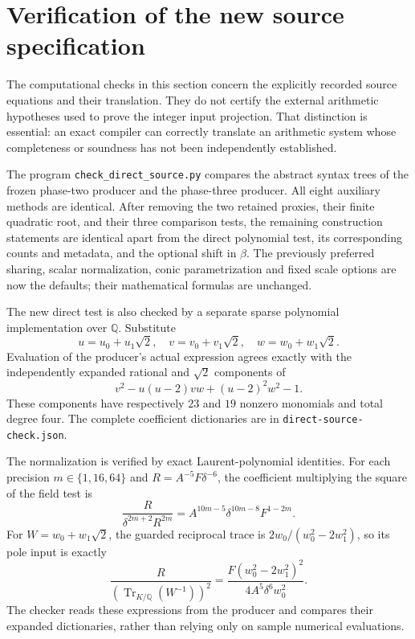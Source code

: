 \section{Verification of the new source specification}
\label{sec:direct-source-review}

The computational checks in this section concern the explicitly
recorded source equations and their translation.  They do not certify
the external arithmetic hypotheses used to prove the integer input
projection.  That distinction is essential: an exact compiler can
correctly translate an arithmetic system whose completeness or soundness
has not been independently established.

The program \texttt{check\_direct\_source.py} compares the abstract
syntax trees of the frozen phase-two producer and the phase-three
producer.  All eight auxiliary methods are identical.  After removing
the two retained proxies, their finite quadratic root, and their three
comparison tests, the remaining construction statements are identical
apart from the direct polynomial test, its corresponding counts and
metadata, and the optional shift in $\beta$.  The previously preferred
sharing, scalar normalization, conic parametrization and fixed scale
options are now the defaults; their mathematical formulas are unchanged.

The new direct test is also checked by a separate sparse polynomial
implementation over $\mathbb Q$.  Substitute
\[
 u=u_0+u_1\sqrt2,\quad v=v_0+v_1\sqrt2,\quad
 w=w_0+w_1\sqrt2.
\]
Evaluation of the producer's actual expression agrees exactly with
the independently expanded rational and $\sqrt2$ components of
\[
                  v^2-u(u-2)vw+(u-2)^2w^2-1.
\]
These components have respectively $23$ and $19$ nonzero monomials
and total degree four.  The complete coefficient dictionaries are
in \texttt{direct-source-check.json}.

The normalization is verified by exact Laurent-polynomial identities.
For each precision $m\in\{1,16,64\}$ and
$R=A^{-5}F\delta^{-6}$, the coefficient multiplying the square of
the field test is
\[
 \frac{R}{\delta^{2m+2}R^{2m}}
          =A^{10m-5}\delta^{10m-8}F^{1-2m}.
\]
For $W=w_0+w_1\sqrt2$, the guarded reciprocal trace is
$2w_0/(w_0^2-2w_1^2)$, so its pole input is exactly
\[
 \frac{R}{(\operatorname{Tr}_{K/\mathbb Q}(W^{-1}))^2}
       =\frac{F(w_0^2-2w_1^2)^2}{4A^5\delta^6w_0^2}.
\]
The checker reads these expressions from the producer and compares
their expanded dictionaries, rather than relying only on sample
numerical evaluations.

